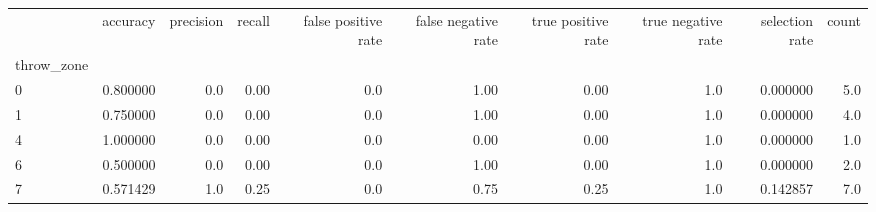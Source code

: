 \begin{tabular}{lrrrrrrrrr}
\toprule
{} &  accuracy &  precision &  recall &  false positive rate &  false negative rate &  true positive rate &  true negative rate &  selection rate &  count \\
throw\_zone &           &            &         &                      &                      &                     &                     &                 &        \\
\midrule
0          &  0.800000 &        0.0 &    0.00 &                  0.0 &                 1.00 &                0.00 &                 1.0 &        0.000000 &    5.0 \\
1          &  0.750000 &        0.0 &    0.00 &                  0.0 &                 1.00 &                0.00 &                 1.0 &        0.000000 &    4.0 \\
4          &  1.000000 &        0.0 &    0.00 &                  0.0 &                 0.00 &                0.00 &                 1.0 &        0.000000 &    1.0 \\
6          &  0.500000 &        0.0 &    0.00 &                  0.0 &                 1.00 &                0.00 &                 1.0 &        0.000000 &    2.0 \\
7          &  0.571429 &        1.0 &    0.25 &                  0.0 &                 0.75 &                0.25 &                 1.0 &        0.142857 &    7.0 \\
\bottomrule
\end{tabular}
